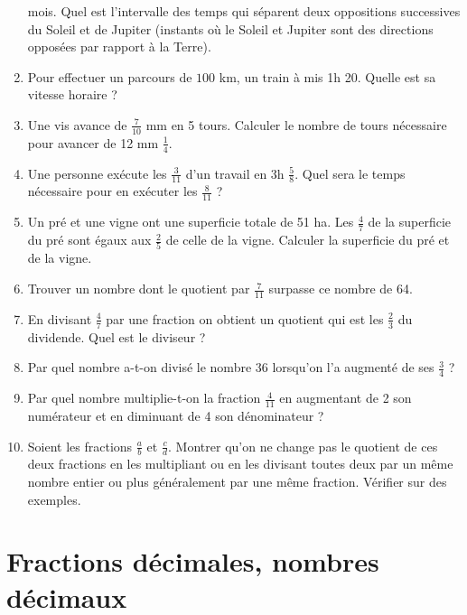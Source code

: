 \documentclass[12 pt]{report}
\theoremstyle{plain}
\newcounter{n}
\begin{document}
\begin{enumerate}
 mois. Quel est l'intervalle des temps qui séparent deux oppositions successives du Soleil et de Jupiter (instants où le Soleil et Jupiter sont des directions opposées par rapport à la Terre). 
 \item Pour effectuer un parcours de $100$ km, un train à mis 1h 20. Quelle
 est sa vitesse horaire ? 
 \item Une vis avance de $\frac7{10}$ mm en 5 tours. Calculer le nombre de
 tours nécessaire pour avancer de 12 mm $\frac14$. 
 \item Une personne exécute les $\frac{3}{11}$ d'un travail en 3h $\frac58$.
 Quel sera le temps nécessaire pour en exécuter les $\frac8{11}$ ? 
 \item Un pré et une vigne ont une superficie totale de 51 ha. Les $\frac47$ de
 la superficie du pré sont égaux aux $\frac25$ de celle de la vigne. Calculer 
 la superficie du pré et de la vigne. 
 \item Trouver un nombre dont le quotient par $\frac7{11}$ surpasse ce nombre
 de 64. 
 \item En divisant $\frac47$ par une fraction on obtient un quotient qui est
 les $\frac23$ du dividende. Quel est le diviseur ? 
 \item Par quel nombre a-t-on divisé le nombre 36 lorsqu'on l'a augmenté de ses $\frac34$ ?
 \item Par quel nombre multiplie-t-on la fraction $\frac4{11}$ en augmentant
 de 2 son numérateur et en diminuant de 4 son dénominateur ? 
 \item Soient les fractions $\frac{a}b$ et $\frac{c}d$. Montrer qu'on ne change pas le quotient de ces deux fractions en les multipliant ou en les divisant toutes deux par un même nombre entier ou plus généralement par une même fraction. Vérifier sur des exemples. 
 
 \end{enumerate}
 
 \chapter{Fractions décimales, nombres décimaux}
 
\end{document}
